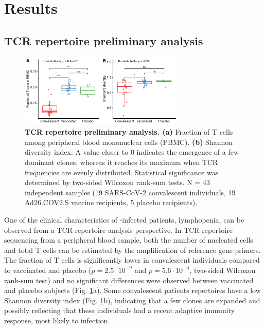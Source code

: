 \chapter*{Results}

\section*{TCR repertoire preliminary analysis}

\begin{figure}[!t]
	\centering
	\includegraphics[width=0.7\textwidth,keepaspectratio]{figures/fig1.pdf}
	\caption{\textbf{TCR repertoire preliminary analysis. (a)} Fraction of T cells among peripheral blood mononuclear cells (PBMC). \textbf{(b)} Shannon diversity index. A value closer to 0 indicates the emergence of a few dominant clones, whereas it reaches its maximum when TCR frequencies are evenly distributed. Statistical significance was determined by two-sided Wilcoxon rank-sum tests. N = 43 independent samples (19 SARS-CoV-2 convalescent individuals, 19 Ad26.COV2.S vaccine recipients, 5 placebo recipients).}
	\label{fig:lymphopenia}
\end{figure}


One of the clinical characteristics of \covid-infected patients, lymphopenia, can be observed from a TCR repertoire analysis perspective. In TCR repertoire sequencing from a peripheral blood sample, both the number of nucleated cells and total T cells can be estimated by the amplification of reference gene primers. The fraction of T cells is significantly lower in convalescent individuals compared to vaccinated and placebo ($p = 2.5\cdot10^{-9}$ and $p = 5.6\cdot10^{-4}$, two-sided Wilcoxon rank-sum test) and no significant differences were observed between vaccinated and placebo subjects (Fig. \ref{fig:lymphopenia}a). Some convalescent patients \TCRB{} repertoires have a low Shannon diversity index (Fig. \ref{fig:lymphopenia}b), indicating that a few clones are expanded and possibly reflecting that these individuals had a recent adaptive immunity response, most likely to \covid{} infection.

